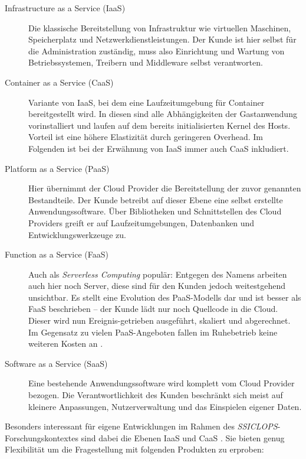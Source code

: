 \begin{description}
	
	\item[Infrastructure as a Service (IaaS)] Die klassische Bereitstellung von Infrastruktur wie virtuellen Maschinen, Speicherplatz und Netzwerkdienstleistungen. Der Kunde ist hier selbst für die Administration zuständig, muss also Einrichtung und Wartung von Betriebssystemen, Treibern und Middleware selbst verantworten.
	
	\item[Container as a Service (CaaS)] Variante von IaaS, bei dem eine Laufzeitumgebung für Container bereitgestellt wird. In diesen sind alle Abhängigkeiten der Gastanwendung vorinstalliert und laufen auf dem bereits initialisierten Kernel des Hosts. Vorteil ist eine höhere Elastizität durch geringeren Overhead. Im Folgenden ist bei der Erwähnung von IaaS immer auch CaaS inkludiert.
	
	\item[Platform as a Service (PaaS)] Hier übernimmt der Cloud Provider die Bereitstellung der zuvor genannten Bestandteile. Der Kunde betreibt auf dieser Ebene eine selbst erstellte Anwendungssoftware. Über Bibliotheken und Schnittstellen des Cloud Providers greift er auf Laufzeitumgebungen, Datenbanken und Entwicklungswerkzeuge zu.
	
	\item[Function as a Service (FaaS)] Auch als \emph{Serverless Computing} populär: Entgegen des Namens arbeiten auch hier noch Server, diese sind für den Kunden jedoch weitestgehend unsichtbar. Es stellt eine Evolution des PaaS-Modells dar und ist besser als FaaS beschrieben -- der Kunde lädt nur noch Quellcode in die Cloud. Dieser wird nun Ereignis-getrieben ausgeführt, skaliert und abgerechnet. Im Gegensatz zu vielen PaaS-Angeboten fallen im Ruhebetrieb keine weiteren Kosten an \cite{crisp:2016:serverless-infrastructure}.
	
	\item[Software as a Service (SaaS)] Eine bestehende Anwendungssoftware wird komplett vom Cloud Provider bezogen. Die Verantwortlichkeit des Kunden beschränkt sich meist auf kleinere Anpassungen, Nutzerverwaltung und das Einspielen eigener Daten.
	
\end{description}

\noindent
Besonders interessant für eigene Entwicklungen im Rahmen des \emph{SSICLOPS}-Forschungskontextes sind dabei die Ebenen IaaS und CaaS \cite{ssiclops:2015:d6.1-project-presentation}. Sie bieten genug Flexibilität um die Fragestellung mit folgenden Produkten zu erproben:

